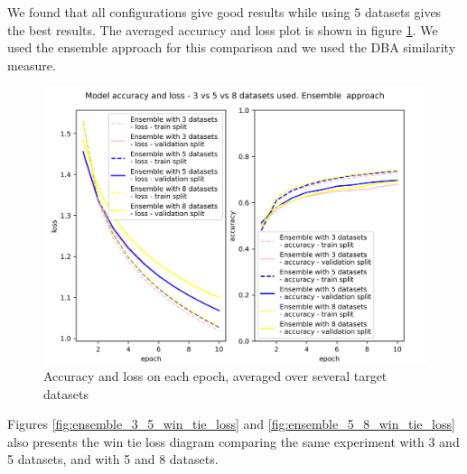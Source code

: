 \documentclass[a4paper,11pt,twoside]{report}
\theoremstyle{definition}
\begin{document}
We found that all configurations give good results while using $5$ datasets gives the best results. The averaged accuracy and loss plot is shown in figure \ref{fig:ensemble_3_5_8}. We used the ensemble approach for this comparison and we used the DBA similarity measure.

\FloatBarrier
\begin{figure}[h!t]
\centering
\includegraphics[width=17cm]{imgs/ensemble_dba_3_vs_5/loss_acc.png}
\caption{Accuracy and loss on each epoch, averaged over several target datasets}
\label{fig:ensemble_3_5_8}
\end{figure}
\FloatBarrier


Figures \ref{fig:ensemble_3_5_win_tie_loss} and
\ref{fig:ensemble_5_8_win_tie_loss} also presents the win tie loss diagram comparing the same experiment with 3 and 5 datasets, and with 5 and 8 datasets.
\end{document}
